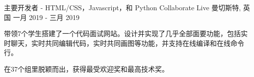\begin{cventries}
  \cventry
    {主要开发者 - HTML/CSS，Javascript，和 Python} %
    {Collaborate Live} %
    {曼切斯特, 英国} %
    {一月 2019 - 三月 2019} %
    {
      \begin{cvitems} %
        \item {带领7个学生搭建了一个代码面试网站。设计并实现了几乎全部面要功能，包括实时聊天，实时共同编辑代码，实时共同画图等功能，并支持在线编译和在线命令行。}
        \item {在37个组里脱颖而出，获得最受欢迎奖和最高技术奖。}
      \end{cvitems}
    }
\end{cventries}

